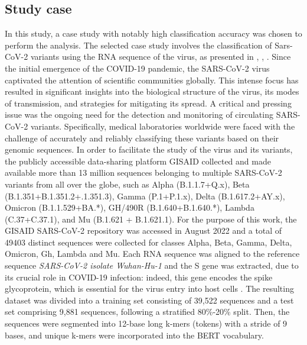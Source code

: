 \documentclass[11pt,a4paper,reqno]{amsart} %
\theoremstyle{definition}
\numberwithin{equation}{section}          %
\begin{document}
\subsection{Study case} 
In this study, a case study with notably high classification accuracy was chosen to perform the analysis. The selected case study involves the classification of Sars-CoV-2 variants using the RNA sequence of the virus, as presented in \cite{ghione2022interpretable}, \cite{Ghione2023}, \cite{articoloIEEEAccess}.
Since the initial emergence of the COVID-19 pandemic, the SARS-CoV-2 virus captivated the attention of scientific communities globally. This intense focus has resulted in significant insights into the biological structure of the virus, its modes of transmission, and strategies for mitigating its spread. A critical and pressing issue was the ongoing need for the detection and monitoring of circulating SARS-CoV-2 variants. Specifically, medical laboratories worldwide were faced with the challenge of accurately and reliably classifying these variants based on their genomic sequences. In order to facilitate the study of the virus and its variants, the publicly accessible data-sharing platform GISAID \cite{gisaid} collected and made available more than 13 million sequences belonging to multiple SARS-CoV-2 variants from all over the globe, such as  Alpha (B.1.1.7+Q.x), Beta (B.1.351+B.1.351.2+.1.351.3), Gamma (P.1+P.1.x), Delta (B.1.617.2+AY.x), Omicron (B.1.1.529+BA.*), GH/490R (B.1.640+B.1.640.*), Lambda (C.37+C.37.1), and Mu (B.1.621 + B.1.621.1). For the purpose of this work, the GISAID SARS-CoV-2 repository was accessed in August 2022 and a total of 49403 distinct sequences were collected for classes Alpha, Beta, Gamma, Delta, Omicron, Gh, Lambda and Mu. Each RNA sequence was aligned to the reference sequence \emph{SARS-CoV-2 isolate Wuhan-Hu-1} \cite{refSequence} and the S gene was extracted, due to its crucial role in COVID-19 infection: indeed, this gene encodes the spike glycoprotein, which is essential for the virus entry into host cells \cite{xia2021domains}.  
The resulting dataset was divided into a training set consisting of 39,522 sequences and a test set comprising 9,881 sequences, following a stratified 80\%-20\% split.
Then, the sequences were segmented into 12-base long k-mers (tokens) with a stride of 9 bases, and unique k-mers were incorporated into the BERT vocabulary.
\end{document}
